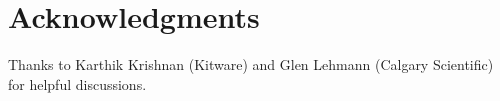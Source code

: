 \documentclass{InsightArticle}
\begin{document}
\section{Acknowledgments}
Thanks to Karthik Krishnan (Kitware) and Glen Lehmann (Calgary Scientific)
for helpful discussions.

%
%
\end{document}
